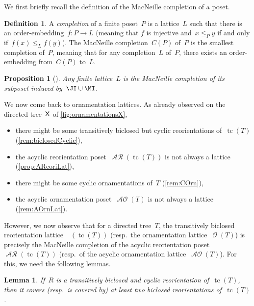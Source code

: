 \documentclass{amsart}
\newtheorem{proposition}[theorem]{Proposition}
\newtheorem{lemma}[theorem]{Lemma}
\theoremstyle{definition}
\newtheorem{definition}[theorem]{Definition}
\renewcommand{\c}[1]{\mathcal{#1}} %
\DeclareMathOperator{\tc}{tc} %
\newcommand{\darkblue}{\color{darkblue}} %
\newcommand{\defn}[1]{\textsl{\darkblue #1}} %
\DeclareMathOperator{\Orn}{\c{O}}  %
\DeclareMathOperator{\AOrn}{\c{AO}}  %
\DeclareMathOperator{\AReori}{\c{AR}}  %
\DeclareMathOperator{\Rbi}{\c{R}^{bi}}  %
\newcommand{\Xgraph}{\sf X} %
\begin{document}
We first briefly recall the definition of the MacNeille completion of a poset.

\begin{definition}
\label{def:MacNeilleCompletion}
A \defn{completion} of a finite poset~$P$ is a lattice~$L$ such that there is an order-embedding~$f : P \to L$ (meaning that $f$ is injective and~$x \le_P y$ if and only if~$f(x) \le_L f(y)$).
The MacNeille completion~$C(P)$ of~$P$ is the smallest completion of~$P$, meaning that for any completion~$L$ of~$P$, there exists an order-embedding from~$C(P)$ to~$L$.
\end{definition}

\begin{proposition}[{\cite[Thm.~7.42]{DaveyPriestley}}]
\label{prop:MacNeilleCompletion}
Any finite lattice~$L$ is the MacNeille completion of its subposet induced by~$\JI \cup \MI$.
\end{proposition}

We now come back to ornamentation lattices.
As already observed on the directed tree~$\Xgraph$ of \cref{fig:ornamentationsX},
\begin{itemize}
\item there might be some transitively biclosed but cyclic reorientations of~$\tc(T)$ (\cref{rem:biclosedCyclic}),
\item the acyclic reorientation poset~$\AReori(\tc(T))$ is not always a lattice (\cref{prop:AReoriLat}),
\item there might be some cyclic ornamentations of~$T$ (\cref{rem:COrn}),
\item the acyclic ornamentation poset~$\AOrn(T)$ is not always a lattice (\cref{rem:AOrnLat}).
\end{itemize}
However, we now observe that for a directed tree~$T$, the transitively biclosed reorientation lattice~$\Rbi(\tc(T))$ (resp.~the ornamentation lattice~$\Orn(T)$) is precisely the MacNeille completion of the acyclic reorientation poset~$\AReori(\tc(T))$ (resp.~of the acyclic ornamentation lattice~$\AOrn(T)$).
For this, we need the following lemmas.

\begin{lemma}
\label{lem:irreduciblesReorientationsAcyclicT}
If~$R$ is a transitively biclosed and cyclic reorientation of~$\tc(T)$, then it covers (resp.~is covered by) at least two biclosed reorientations of~$\tc(T)$.
\end{lemma}
\end{document}
